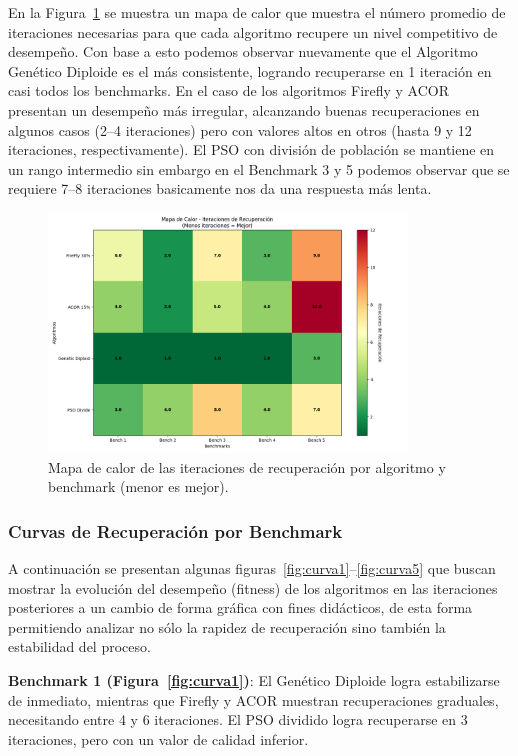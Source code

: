 \documentclass[10pt]{article}
\begin{document}
En la Figura~\ref{fig:heatmap} se muestra un mapa de calor que muestra el número promedio de iteraciones necesarias para que cada algoritmo recupere un nivel competitivo de desempeño. Con base a esto podemos observar nuevamente que el Algoritmo Genético Diploide es el más consistente, logrando recuperarse en 1 iteración en casi todos los benchmarks. En el caso de los algoritmos Firefly y ACOR presentan un desempeño más irregular, alcanzando buenas recuperaciones en algunos casos (2–4 iteraciones) pero con valores altos en otros (hasta 9 y 12 iteraciones, respectivamente). El PSO con división de población se mantiene en un rango intermedio sin embargo en el Benchmark 3 y 5 podemos observar que se requiere 7–8 iteraciones basicamente nos da una respuesta más lenta.

\begin{figure}[H]
    \centering
    \includegraphics[width=0.85\textwidth]{imagenes/mapaDeCalor.png}
    \caption{Mapa de calor de las iteraciones de recuperación por algoritmo y benchmark (menor es mejor).}
    \label{fig:heatmap}
\end{figure}

\subsubsection*{Curvas de Recuperación por Benchmark}

A continuación se presentan algunas figuras~\ref{fig:curva1}–\ref{fig:curva5} que buscan mostrar la evolución del desempeño (fitness) de los algoritmos en las iteraciones posteriores a un cambio de forma gráfica con fines didácticos, de esta forma permitiendo analizar no sólo la rapidez de recuperación sino también la estabilidad del proceso.

\textbf{Benchmark 1 (Figura~\ref{fig:curva1})}: El Genético Diploide logra estabilizarse de inmediato, mientras que Firefly y ACOR muestran recuperaciones graduales, necesitando entre 4 y 6 iteraciones. El PSO dividido logra recuperarse en 3 iteraciones, pero con un valor de calidad inferior.
\end{document}
